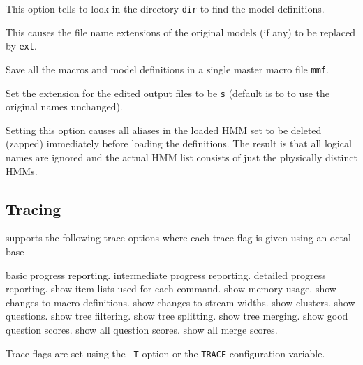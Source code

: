 \begin{optlist}

   This option tells  to look in
      the directory \texttt{dir} to find the model definitions.

    This causes the file name extensions of the
      original models (if any) to be replaced by \texttt{ext}.

   Save all the macros and model definitions in a
        single master macro file \texttt{mmf}.

   Set the extension for the edited output files to be \texttt{s} 
      (default is to to use the original names unchanged).

   Setting this option causes all aliases in the loaded
      HMM set to be deleted (zapped) immediately before 
      loading the definitions.  The result is that all logical names
      are ignored and the actual HMM list
      consists of just the physically distinct HMMs.
\stdoptB
\stdoptH
\stdoptM
\stdoptQ

\end{optlist}

\subsection{Tracing}

 supports the following trace options where each
trace flag is given using an octal base
\begin{optlist}
    basic progress reporting.
    intermediate progress reporting.
    detailed progress reporting.
    show item lists used for each command.
    show memory usage.
    show changes to macro definitions.
    show changes to stream widths.
    show clusters.
    show questions.
    show tree filtering.
    show tree splitting.
    show tree merging.
    show good question scores.
    show all question scores.
    show all merge scores.
\end{optlist}
Trace flags are set using the \texttt{-T} option or the  \texttt{TRACE} 
configuration variable.


